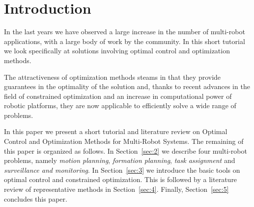
\section{Introduction}\label{sec:1}

In the last years we have observed a large increase in the number of multi-robot applications, with a large body of work by the community. In this short tutorial we look specifically at solutions involving optimal control and optimization methods. 

The attractiveness of optimization methods steams in that they provide guarantees in the optimality of the solution and, thanks to recent advances in the field of constrained optimization and an increase in computational power of robotic platforms, they are now applicable to efficiently solve a wide range of problems.

In this paper we present a short tutorial and literature review on Optimal Control and Optimization Methods for Multi-Robot Systems. The remaining of this paper is organized as follows. In Section~\ref{sec:2} we describe four multi-robot problems, namely \emph{motion planning}, \emph{formation planning}, \emph{task assignment} and \emph{surveillance and monitoring}. In Section~\ref{sec:3} we introduce the basic tools on optimal control and constrained optimization. This is followed by a literature review of representative methods in Section~\ref{sec:4}. Finally, Section~\ref{sec:5} concludes this paper.